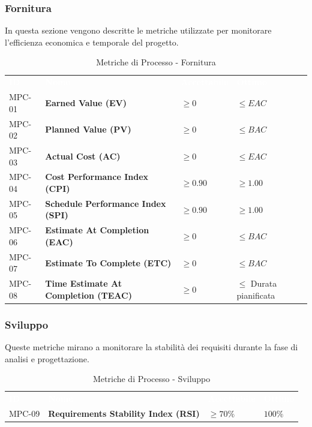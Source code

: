 \documentclass[a4paper, 11pt]{article}
\begin{document}
\subsubsection{Fornitura}
In questa sezione vengono descritte le metriche utilizzate per monitorare l'efficienza economica e temporale del progetto.
\begin{table}[h!]
    \centering
    \begin{tabular}{>{\centering\arraybackslash}m{1.5cm} p{6cm} >{\centering\arraybackslash}m{3cm} >{\centering\arraybackslash}m{2.5cm}}
        \rowcolor{AccentColor}
        \textcolor{white}{\textbf{ID}} & \textcolor{white}{\textbf{Nome}} & \textcolor{white}{\textbf{Accettabile}} & \textcolor{white}{\textbf{Ottimo}} \\

        MPC-01 & \textbf{Earned Value (EV)} & $\geq 0$ & $\leq EAC$ \\
        MPC-02 & \textbf{Planned Value (PV)} & $\geq 0$ & $\leq BAC$ \\
        MPC-03 & \textbf{Actual Cost (AC)} & $\geq 0$ & $\leq EAC$ \\
        MPC-04 & \textbf{Cost Performance Index (CPI)} & $\geq 0.90$ & $\geq 1.00$ \\
        MPC-05 & \textbf{Schedule Performance Index (SPI)} & $\geq 0.90$ & $\geq 1.00$ \\
        MPC-06 & \textbf{Estimate At Completion (EAC)} & $\geq 0$ & $\leq BAC$ \\
        MPC-07 & \textbf{Estimate To Complete (ETC)} & $\geq 0$ & $\leq BAC$ \\
        MPC-08 & \textbf{Time Estimate At Completion (TEAC)} & $\geq 0$ & \parbox[c]{2.5cm}{\centering $\leq$ Durata pianificata} \\

    \end{tabular}
    \caption{Metriche di Processo - Fornitura}
\end{table}

\subsubsection{Sviluppo}
Queste metriche mirano a monitorare la stabilità dei requisiti durante la fase di analisi e progettazione.
\begin{table}[h!]
    \centering
    \begin{tabular}{>{\centering\arraybackslash}m{1.5cm} p{6cm} >{\centering\arraybackslash}m{3cm} >{\centering\arraybackslash}m{2.5cm}}
        \rowcolor{AccentColor}
        \textcolor{white}{\textbf{ID}} & \textcolor{white}{\textbf{Nome}} & \textcolor{white}{\textbf{Accettabile}} & \textcolor{white}{\textbf{Ottimo}} \\
        
        MPC-09 & \textbf{Requirements Stability Index (RSI)} & $\geq 70\%$ & $100\%$ \\
    \end{tabular}
    \caption{Metriche di Processo - Sviluppo}
\end{table}
\end{document}
